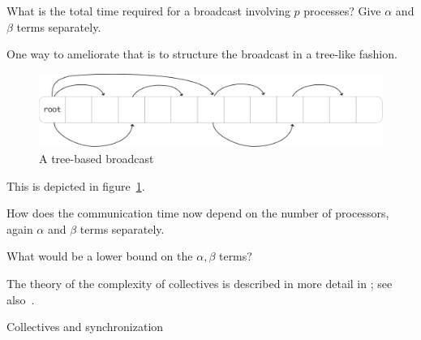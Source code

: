 \begin{exercise}
  \label{ex:latencylinear}
  What is the total time required for a broadcast involving $p$
  processes?
  Give $\alpha$ and $\beta$ terms separately.
\end{exercise}

One way to ameliorate that is to structure the
broadcast in a tree-like fashion.
\begin{figure}[ht]
  \includegraphics[scale=.1]{graphics/bcast-tree}
  \caption{A tree-based broadcast}
  \label{fig:bcast-tree}
\end{figure}
This is depicted in figure~\ref{fig:bcast-tree}.

\begin{exercise}
  \label{ex:latencylog}
  How does the
  communication time now depend on the number of processors, again
  $\alpha$ and $\beta$ terms separately.

  What would be a lower bound on the $\alpha,\beta$ terms?
\end{exercise}

The theory
of the complexity of collectives is described in more detail in
; see also~\cite{Chan2007Collective}.

 {Collectives and synchronization}
\label{sec:collect-sync}

